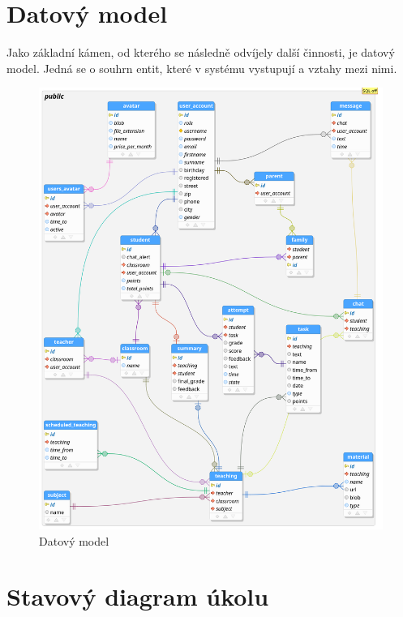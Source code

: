 \documentclass[twoside]{ctuthesis}
\theoremstyle{plain}
\theoremstyle{definition}
\theoremstyle{note}
\begin{document}
\section{Datový model}
Jako základní kámen, od kterého se následně odvíjely další činnosti, je datový model. Jedná se o souhrn entit, které v systému vystupují a vztahy mezi nimi.


\textit{}
\cite{merunka_vojtech_2006}

\begin{figure}
    \caption{Datový model}
    \centering
    \includegraphics[width=\textwidth]{images/2021_04_14_datovy_model}
\end{figure}



\section{Stavový diagram úkolu}
\end{document}
